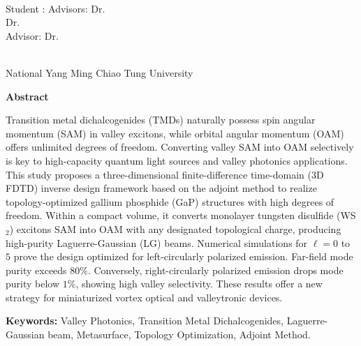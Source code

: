 \begin{center}
    \large
    
    \begin{singlespace}
        \textbf{\englishTitle{}} \\[0.5cm]
    \end{singlespace}
    
    \begin{singlespace}
        Student : \studentEnName{}  \hspace{1.0cm} 
        \ifdefined\advisorCnNameB
            Advisors: Dr.\, \advisorEnName \\
            \hspace{6.6cm} Dr.\, \advisorEnNameB  \\
        \else
            Advisor: Dr.\, \advisorEnName \\
        \fi
    \end{singlespace}
    
    \vspace{0.5cm}
    \begin{singlespace}
        \NameofDepartmentInstituteEN\\
        National Yang Ming Chiao Tung University\\[0.2cm]
    \end{singlespace}
    
    \textbf{Abstract} \\[0.5cm]

\end{center}

\normalsize
Transition metal dichalcogenides (TMDs) naturally possess spin angular momentum (SAM) in valley excitons, while orbital angular momentum (OAM) offers unlimited degrees of freedom. Converting valley SAM into OAM selectively is key to high-capacity quantum light sources and valley photonics applications.
This study proposes a three-dimensional finite-difference time-domain (3D FDTD) inverse design framework based on the adjoint method to realize topology-optimized gallium phosphide (GaP) structures with high degrees of freedom. Within a compact volume, it converts monolayer tungsten disulfide (WS$_2$) excitons SAM into OAM with any designated topological charge, producing high-purity Laguerre-Gaussian (LG) beams.
Numerical simulations for $\ell = 0$ to $5$ prove the design optimized for left-circularly polarized emission. Far-field mode purity exceeds $80\%$. Conversely, right-circularly polarized emission drops mode purity below $1\%$, showing high valley selectivity. These results offer a new strategy for miniaturized vortex optical and valleytronic devices.
\vspace{1cm}

\textbf{Keywords: } Valley Photonics, Transition Metal Dichalcogenides, Laguerre-Gaussian beam, Metasurface, Topology Optimization, Adjoint Method.